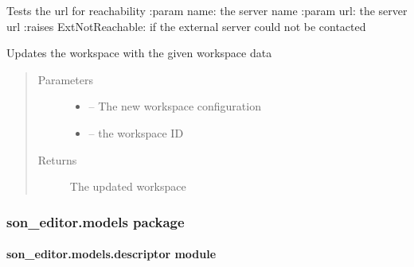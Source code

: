 \documentclass[letterpaper,10pt,english]{sphinxmanual}
\begin{document}

\begin{fulllineitems}
\label{_source/son_editor.impl:son_editor.impl.workspaceimpl.test_url}
Tests the url for reachability
:param name: the server name
:param url: the server url
:raises ExtNotReachable: if the external server could not be contacted

\end{fulllineitems}


\begin{fulllineitems}
\label{_source/son_editor.impl:son_editor.impl.workspaceimpl.update_workspace}
Updates the workspace with the given workspace data
\begin{quote}\begin{description}
\item[{Parameters}] \leavevmode\begin{itemize}
\item {} 
 -- The new workspace configuration

\item {} 
 -- the workspace ID

\end{itemize}

\item[{Returns}] \leavevmode
The updated workspace

\end{description}\end{quote}

\end{fulllineitems}



\subsubsection{son\_editor.models package}
\label{_source/son_editor.models:son-editor-models-package}\label{_source/son_editor.models::doc}

\paragraph{son\_editor.models.descriptor module}
\label{_source/son_editor.models:module-son_editor.models.descriptor}\label{_source/son_editor.models:son-editor-models-descriptor-module}
\end{document}
